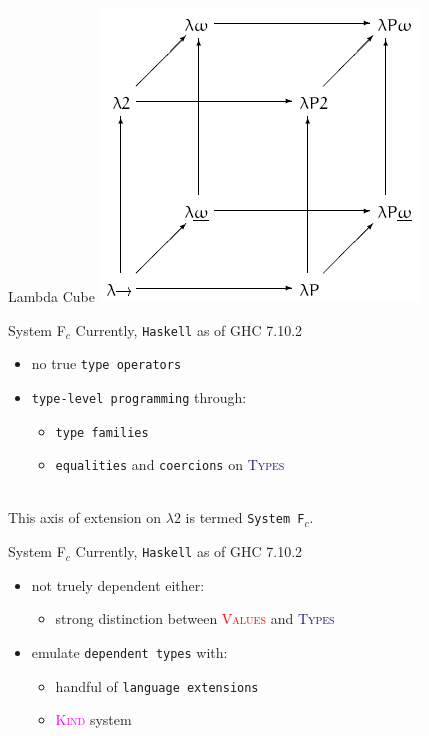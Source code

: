 \documentclass[xcolor={usenames,dvipsnames}]{beamer}
\newcommand{\htycon}[1]{\textcolor{MidnightBlue}{\textsc{#1}}}
\newcommand{\hvalcon}[1]{\textcolor{Red}{\textsc{#1}}}
\newcommand{\hkind}[1]{\textcolor{Fuchsia}{\textsc{#1}}}
\begin{document}
\begin{frame}[fragile]{Lambda Cube}
  \includegraphics[scale=0.6]{Lambda_cube.png}
\end{frame}

\begin{frame}[fragile]{System F$_c$}
  Currently, \texttt{Haskell} as of GHC 7.10.2
  \begin{itemize}
    \item no true \texttt{type operators}
    \item \texttt{type-level programming} through:
      \begin{itemize}
        \item \texttt{type families}
        \item \texttt{equalities} and \texttt{coercions} on \htycon{Types}
      \end{itemize}
  \end{itemize}

  \ \\
  This axis of extension on $\lambda2$ is termed \texttt{System F$_c$}.
\end{frame}

\begin{frame}[fragile]{System F$_c$}
  Currently, \texttt{Haskell} as of GHC 7.10.2
  \begin{itemize}
    \item not truely dependent either:
      \begin{itemize}
        \item strong distinction between \hvalcon{Values} and \htycon{Types}
      \end{itemize}
    \item emulate \texttt{dependent types} with:
      \begin{itemize}
        \item handful of \texttt{language extensions}
        \item \hkind{Kind} system
      \end{itemize}
  \end{itemize}
\end{frame}
\end{document}

